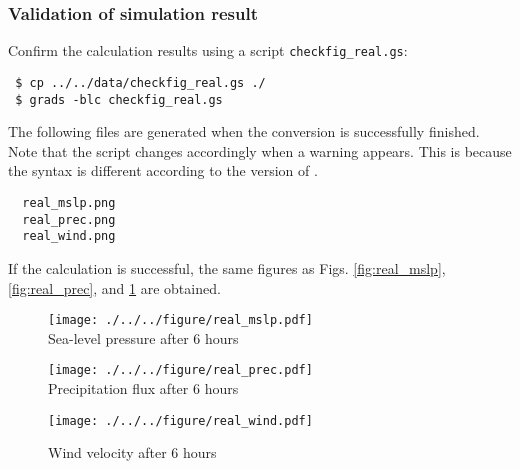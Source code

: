 \subsubsection{Validation of simulation result}
Confirm the calculation results using a \grads script \verb|checkfig_real.gs|: 
\begin{verbatim}
 $ cp ../../data/checkfig_real.gs ./
 $ grads -blc checkfig_real.gs
\end{verbatim}
The following files are generated when the conversion is successfully finished.
Note that the script changes accordingly when a warning appears.
This is because the syntax is different according to the version of \grads.
\begin{verbatim}
  real_mslp.png
  real_prec.png
  real_wind.png
\end{verbatim}
If the calculation is successful,
the same figures as Figs. \ref{fig:real_mslp}, \ref{fig:real_prec}, and \ref{fig:real_wind} are obtained.

\begin{figure}[tbh]
\begin{center}
  \texttt{[image: ./../../figure/real\_mslp.pdf]}\\
  \caption{Sea-level pressure after 6 hours}
  \label{fig:real_mslp}
\end{center}
\begin{center}
  \texttt{[image: ./../../figure/real\_prec.pdf]}\\
  \caption{Precipitation flux after 6 hours}
  \label{fig:real_prec}
\end{center}
\begin{center}
  \texttt{[image: ./../../figure/real\_wind.pdf]}\\
  \caption{Wind velocity after 6 hours}
  \label{fig:real_wind}
\end{center}
\end{figure}

